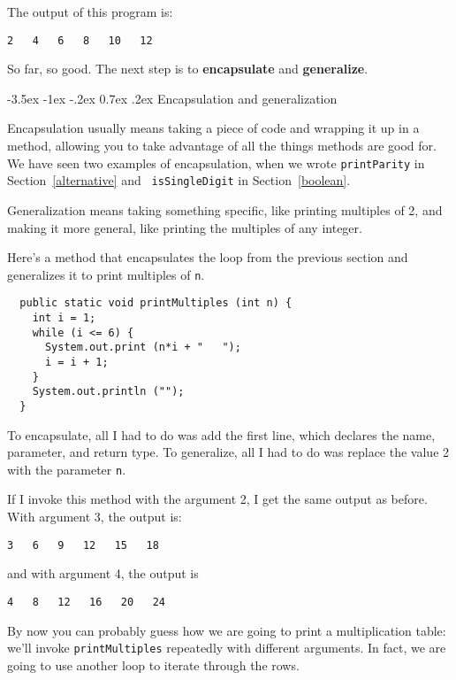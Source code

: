 \documentclass{book}
\makeatletter
\renewcommand{\section}{\@startsection 
    {section} {1} {0mm}%
    {-3.5ex \@plus -1ex \@minus -.2ex}%
    {0.7ex \@plus.2ex}%
    {\normalfont\Large\bfseries}}
\makeatother
\begin{document}
The output of this program is:

\begin{verbatim}
2   4   6   8   10   12
\end{verbatim}
%
So far, so good.  The next step is to {\bf encapsulate} and {\bf
generalize}.

\section {Encapsulation and generalization}
\label{encapsulation}

Encapsulation usually means taking a piece of code and wrapping it up
in a method, allowing you to take advantage of all the things methods
are good for.  We have seen two examples of encapsulation, when we
wrote {\tt printParity} in Section~\ref{alternative} and {\tt
isSingleDigit} in Section~\ref{boolean}.

Generalization means taking something specific, like printing
multiples of 2, and making it more general, like printing the
multiples of any integer.


Here's a method that encapsulates the loop from the previous
section and generalizes it to print multiples of {\tt n}.

\begin{verbatim}
  public static void printMultiples (int n) {
    int i = 1;
    while (i <= 6) {
      System.out.print (n*i + "   ");
      i = i + 1;
    }    
    System.out.println ("");
  }
\end{verbatim}
%
To encapsulate, all I had to do was add the first line,
which declares the name, parameter,
and return type.  To generalize, all I had to do was replace
the value 2 with the parameter {\tt n}.

If I invoke this method with the argument 2, I get the same
output as before.  With argument 3, the output is:

\begin{verbatim}
3   6   9   12   15   18
\end{verbatim}
%
and with argument 4, the output is

\begin{verbatim}
4   8   12   16   20   24 
\end{verbatim}
%
By now you can probably guess how we are going to print a
multiplication table: we'll invoke {\tt printMultiples} repeatedly with
different arguments.  In fact, we are going to use another loop to
iterate through the rows.
\end{document}
